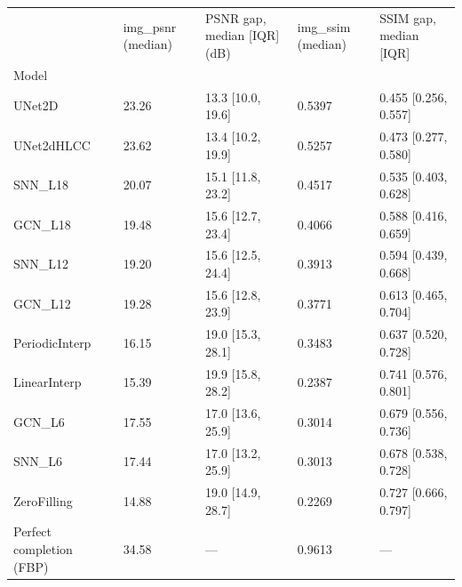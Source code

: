 \begin{tabular}{lllll}
\toprule
 & img\_psnr (median) & PSNR gap, median [IQR] (dB) & img\_ssim (median) & SSIM gap, median [IQR] \\
Model &  &  &  &  \\
\midrule
UNet2D & 23.26 & 13.3 [10.0, 19.6] & 0.5397 & 0.455 [0.256, 0.557] \\
UNet2dHLCC & 23.62 & 13.4 [10.2, 19.9] & 0.5257 & 0.473 [0.277, 0.580] \\
SNN\_L18 & 20.07 & 15.1 [11.8, 23.2] & 0.4517 & 0.535 [0.403, 0.628] \\
GCN\_L18 & 19.48 & 15.6 [12.7, 23.4] & 0.4066 & 0.588 [0.416, 0.659] \\
SNN\_L12 & 19.20 & 15.6 [12.5, 24.4] & 0.3913 & 0.594 [0.439, 0.668] \\
GCN\_L12 & 19.28 & 15.6 [12.8, 23.9] & 0.3771 & 0.613 [0.465, 0.704] \\
PeriodicInterp & 16.15 & 19.0 [15.3, 28.1] & 0.3483 & 0.637 [0.520, 0.728] \\
LinearInterp & 15.39 & 19.9 [15.8, 28.2] & 0.2387 & 0.741 [0.576, 0.801] \\
GCN\_L6 & 17.55 & 17.0 [13.6, 25.9] & 0.3014 & 0.679 [0.556, 0.736] \\
SNN\_L6 & 17.44 & 17.0 [13.2, 25.9] & 0.3013 & 0.678 [0.538, 0.728] \\
ZeroFilling & 14.88 & 19.0 [14.9, 28.7] & 0.2269 & 0.727 [0.666, 0.797] \\
Perfect completion (FBP) & 34.58 & — & 0.9613 & — \\
\bottomrule
\end{tabular}
